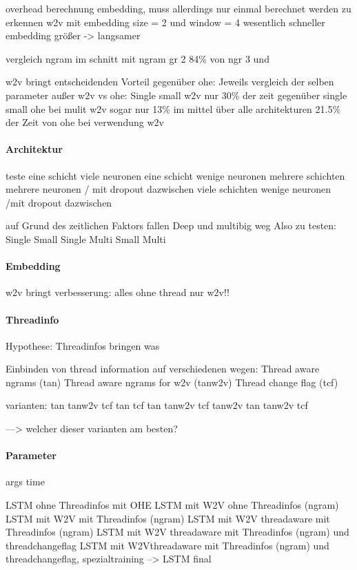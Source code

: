     overhead berechnung embedding, muss allerdings nur einmal berechnet werden
    zu erkennen w2v mit embedding size = 2  und window = 4 wesentlich schneller
    embedding größer -> langsamer

vergleich ngram
im schnitt mit ngram gr 2 84\% von ngr 3 und 

w2v bringt entscheidenden Vorteil gegenüber ohe:
Jeweils vergleich der selben parameter außer w2v vs ohe:
Single small w2v nur 30\% der zeit gegenüber single small ohe
bei mulit w2v sogar nur 13\%
im mittel über alle architekturen 21.5\% der Zeit von ohe bei verwendung w2v

\paragraph{Architektur}
teste eine schicht viele neuronen 
eine schicht wenige neuronen
mehrere schichten mehrere neuronen / mit dropout dazwischen
viele schichten wenige neuronen /mit dropout dazwischen

auf Grund des zeitlichen Faktors fallen Deep und multibig weg
Also zu testen:
Single Small
Single 
Multi Small
Multi 

\paragraph{Embedding}

w2v bringt verbesserung:
alles ohne thread nur w2v!!

\paragraph{Threadinfo}
Hypothese:
Threadinfos bringen was

Einbinden von thread information auf verschiedenen wegen:
Thread aware ngrams (tan)
Thread aware ngrams for w2v (tanw2v)
Thread change flag (tcf)

varianten:
tan
tanw2v
tcf
tan tcf
tan tanw2v
tcf tanw2v
tan tanw2v tcf

---> welcher dieser varianten am besten?

\paragraph{Parameter}
args
time

LSTM ohne Threadinfos mit OHE
LSTM mit W2V ohne Threadinfos (ngram)
LSTM mit W2V mit Threadinfos (ngram)
LSTM mit W2V threadaware mit Threadinfos (ngram)
LSTM mit W2V threadaware mit Threadinfos (ngram) und threadchangeflag
LSTM mit W2Vthreadaware mit Threadinfos (ngram) und threadchangeflag, spezialtraining
--> LSTM final

